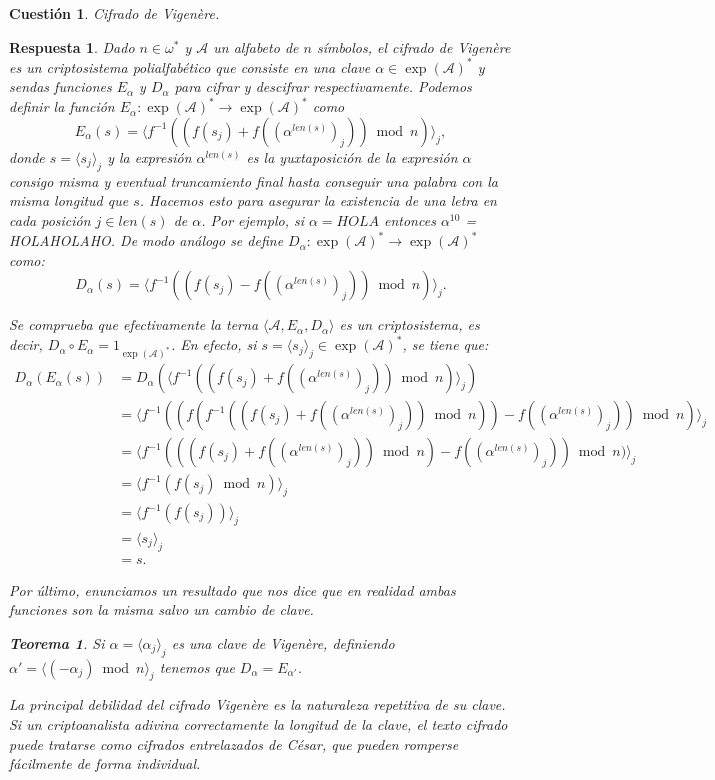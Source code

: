 \documentclass[
  a4paper,
  spanish,
  12pt,
]{scrartcl}
\theoremstyle{ejercicio-style}
\newtheorem{ejer}{Cuestión}
\theoremstyle{remark-style}
\newtheorem*{sol}{Respuesta}
\theoremstyle{teorema-style}
\newtheorem*{nth}{Teorema}
\begin{document}
\newpage

\begin{ejer}
  Cifrado de Vigenère.
\end{ejer}

\begin{sol}
  Dado $n \in \omega^\ast$ y $\mathcal{A}$ un alfabeto de $n$ símbolos, el cifrado de Vigenère es un criptosistema polialfabético que consiste en una clave $\alpha\in \exp (\mathcal{A})^*$ y sendas funciones $E_\alpha$ y $D_\alpha$ para cifrar y descifrar respectivamente. Podemos definir la función $E_\alpha: \exp (\mathcal{A})^* \to \exp (\mathcal{A})^*$ como
\[ E_\alpha (s) = \langle f^{-1}( (f(s_j) + f((\alpha^{len(s)})_j)) \bmod  n)\rangle _j, \]
donde $s = \langle s_j \rangle_j$ y la expresión $\alpha^{len(s)}$ es la yuxtaposición de la expresión $\alpha$ consigo misma y eventual truncamiento final hasta conseguir una palabra con la misma longitud que $s$. Hacemos esto para asegurar la existencia de una letra en cada posición $j \in len(s)$ de $\alpha$. Por ejemplo, si $\alpha = HOLA$ entonces $\alpha^{10}$ = HOLAHOLAHO. De modo análogo se define $D_\alpha: \exp (\mathcal{A})^* \to \exp (\mathcal{A})^*$ como:
 \[D_\alpha (s) = \langle f^{-1}( (f(s_j) - f((\alpha^{len(s)})_j)) \bmod  n)\rangle _j.\]

  Se comprueba que efectivamente la terna $\langle \mathcal{A}, E_\alpha, D_\alpha \rangle$ es un criptosistema, es decir,  $D_\alpha \circ E_\alpha = 1_{\exp(\mathcal A)^*}$. En efecto, si $s=\langle s_j \rangle _j \in \exp(\mathcal A)^*$, se tiene que:
\begin{align*}
  D_\alpha(E_\alpha(s)) &= D_\alpha(\langle f^{-1}( (f(s_j) + f((\alpha^{len(s)})_j)) \bmod  n)\rangle _j)\\
  &= \langle f^{-1}((f(f^{-1}( (f(s_j) + f((\alpha^{len(s)})_j)) \bmod  n)) - f((\alpha^{len(s)})_j)) \bmod  n)\rangle _j\\
  &= \langle f^{-1}(( (f(s_j) + f((\alpha^{len(s)})_j)) \bmod  n) - f((\alpha^{len(s)})_j)) \bmod  n)\rangle _j\\
  &= \langle f^{-1}(f(s_j)\bmod  n)\rangle _j\\
  &= \langle f^{-1}(f(s_j))\rangle _j\\
  &= \langle s_j\rangle _j\\
  &= s.
\end{align*}

  Por último, enunciamos un resultado que nos dice que en realidad ambas funciones son la misma salvo un cambio de clave.

\begin{nth}
      Si $\alpha = \langle \alpha_j \rangle_j$ es una clave de Vigenère, definiendo $\alpha' = \langle (-\alpha_j) \bmod  n \rangle _j$ tenemos que $D_\alpha = E_{\alpha'}$.
\end{nth}


La principal debilidad del cifrado Vigenère es la naturaleza repetitiva de su clave. Si un criptoanalista adivina correctamente la longitud de la clave, el texto cifrado puede tratarse como cifrados entrelazados de César, que pueden romperse fácilmente de forma individual.
\end{sol}
\end{document}
